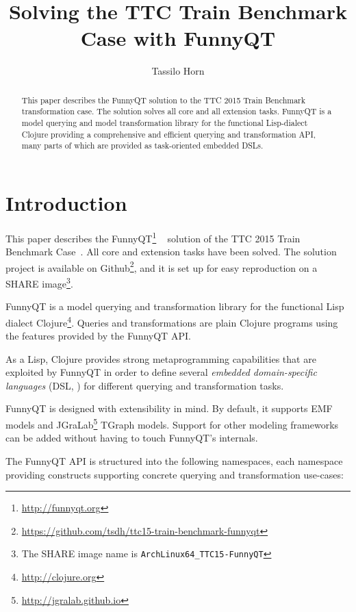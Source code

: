 \documentclass[submission]{eptcs}
\title{Solving the TTC Train Benchmark Case with FunnyQT}
\author{Tassilo Horn
  \institute{Institute for Software Technology, University Koblenz-Landau, Germany}
  \email{horn@uni-koblenz.de}}
\begin{document}
\maketitle

\begin{abstract}
  This paper describes the FunnyQT solution to the TTC 2015 Train Benchmark
  transformation case.  The solution solves all core and all extension tasks.
  FunnyQT is a model querying and model transformation library for the
  functional Lisp-dialect Clojure providing a comprehensive and efficient
  querying and transformation API, many parts of which are provided as
  task-oriented embedded DSLs.
\end{abstract}


\section{Introduction}
\label{sec:introduction}

This paper describes the FunnyQT\footnote{\url{http://funnyqt.org}}
~\cite{Horn2013MQWFQ,funnyqt-icgt15} solution of the TTC 2015 Train Benchmark
Case~\cite{train-benchmark-case-desc}.  All core and extension tasks have been
solved.  The solution project is available on
Github\footnote{\url{https://github.com/tsdh/ttc15-train-benchmark-funnyqt}},
and it is set up for easy reproduction on a SHARE image\footnote{The SHARE
  image name is \verb|ArchLinux64_TTC15-FunnyQT|}.

FunnyQT is a model querying and transformation library for the functional Lisp
dialect Clojure\footnote{\url{http://clojure.org}}.  Queries and
transformations are plain Clojure programs using the features provided by the
FunnyQT API.

As a Lisp, Clojure provides strong metaprogramming capabilities that are
exploited by FunnyQT in order to define several \emph{embedded domain-specific
  languages} (DSL, \cite{book:Fowler2010DSL}) for different querying and
transformation tasks.

FunnyQT is designed with extensibility in mind.  By default, it supports EMF
\cite{Steinberg2008EEM} models and
JGraLab\footnote{\url{http://jgralab.github.io}} TGraph models.  Support for
other modeling frameworks can be added without having to touch FunnyQT's
internals.

The FunnyQT API is structured into the following namespaces, each namespace
providing constructs supporting concrete querying and transformation use-cases:
\end{document}
